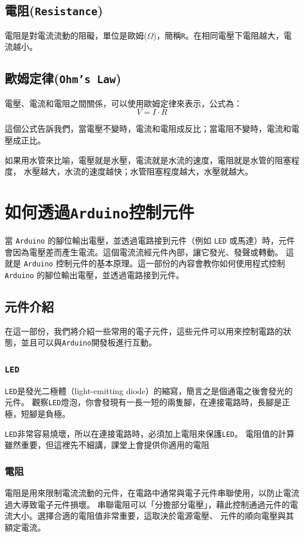 \documentclass[12pt,a4paper]{article}
\begin{document}
\subsection{電阻(\texttt{Resistance})}
電阻是對電流流動的阻礙，單位是歐姆($\Omega$)，簡稱\texttt{R}。在相同電壓下電阻越大，電流越小。

\subsection{歐姆定律(\texttt{Ohm's Law})}
電壓、電流和電阻之間關係，可以使用歐姆定律來表示，公式為：
$$
V = I \cdot R
$$

這個公式告訴我們，當電壓不變時，電流和電阻成反比；當電阻不變時，電流和電壓成正比。

如果用水管來比喻，電壓就是水壓，電流就是水流的速度，電阻就是水管的阻塞程度，
水壓越大，水流的速度越快；水管阻塞程度越大，水壓就越大。

\section{如何透過\texttt{Arduino}控制元件}

當 \texttt{Arduino} 的腳位輸出電壓，並透過電路接到元件（例如 \texttt{LED} 或馬達）時，元件會因為電壓差而產生電流。這個電流流經元件內部，讓它發光、發聲或轉動。
這就是 \texttt{Arduino} 控制元件的基本原理。這一部份的內容會教你如何使用程式控制 \texttt{Arduino} 的腳位輸出電壓，並透過電路接到元件。

\subsection{元件介紹}
在這一部份，我們將介紹一些常用的電子元件，這些元件可以用來控制電路的狀態，並且可以與\texttt{Arduino}開發板進行互動。

\subsubsection{\texttt{LED}}

\texttt{LED}是發光二極體（light-emitting diode）的縮寫，簡言之是個通電之後會發光的元件。
觀察\texttt{LED}燈泡，你會發現有一長一短的兩隻腳，在連接電路時，長腳是正極，短腳是負極。

\texttt{LED}非常容易燒壞，所以在連接電路時，必須加上電阻來保護\texttt{LED}。
電阻值的計算雖然重要，但這裡先不細講，課堂上會提供你適用的電阻

\subsubsection{電阻}
電阻是用來限制電流流動的元件，在電路中通常與電子元件串聯使用，以防止電流過大導致電子元件損壞。
串聯電阻可以「分擔部分電壓」，藉此控制通過元件的電流大小。選擇合適的電阻值非常重要，這取決於電源電壓、
元件的順向電壓與其額定電流。
\end{document}
